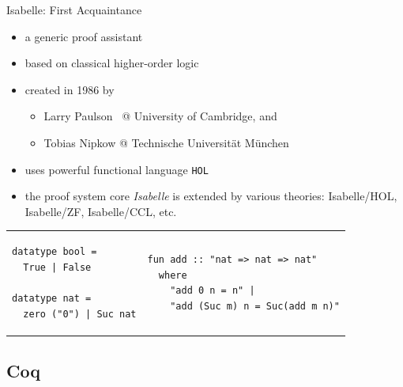 \documentclass[aspectratio=169, fleqn]{beamer}
\begin{document}
\begin{frame}[fragile]{Isabelle: First Acquaintance}


\vspace{10pt}
\begin{itemize}
  \item a generic proof assistant
  \item based on classical higher-order logic
  \item created in 1986 by
    \begin{itemize}
    \item Larry Paulson \ @ University of Cambridge, and
    \item Tobias Nipkow @ Technische Universit\"{a}t M\"{u}nchen
    \end{itemize}
  \item \textcolor{dkgray}{ uses powerful functional language \texttt{HOL} }
  \item \textcolor{dkgray}{ the proof system core \textit{Isabelle} is extended by various theories: Isabelle/HOL, Isabelle/ZF, Isabelle/CCL, etc. }
\end{itemize}

\begin{tabular}{p{.45\linewidth} p{.45\linewidth}}
\begin{lstlisting}[language=isabelle, caption={Definition of basic datatypes 
%in Isabelle:
}]
datatype bool = 
  True | False
  
datatype nat = 
  zero ("0") | Suc nat
\end{lstlisting}
&
\begin{lstlisting}[language=isabelle,caption={Definition of addition over \texttt{nat} }]
fun add :: "nat => nat => nat"
  where
    "add 0 n = n" |
    "add (Suc m) n = Suc(add m n)"
\end{lstlisting}
\end{tabular}

\end{frame}



\subsection{Coq}
\end{document}
